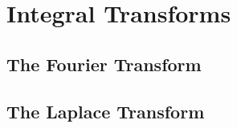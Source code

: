 \section{Integral Transforms}

\subsection{The Fourier Transform}


\subsection{The Laplace Transform}


